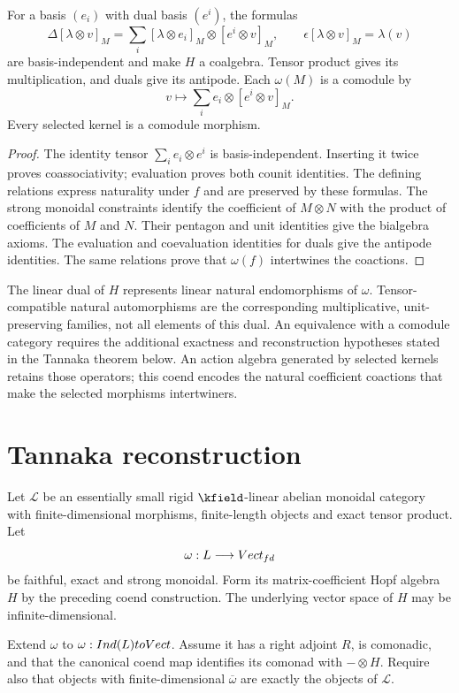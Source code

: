 \begin{proposition}\label{cyiv:k3-coend}
For a basis $(e_i)$ with dual basis $(e^i)$, the formulas
\[
 \Delta[\lambda\otimes v]_M
 =\sum_i[\lambda\otimes e_i]_M\otimes[e^i\otimes v]_M,
 \qquad \epsilon[\lambda\otimes v]_M=\lambda(v)
\]
are basis-independent and make $H$ a coalgebra.
Tensor product gives its multiplication, and duals give its antipode.
Each $\omega(M)$ is a comodule by
\[
 v\longmapsto\sum_i e_i\otimes[e^i\otimes v]_M.
\]
Every selected kernel is a comodule morphism.
\end{proposition}
\begin{proof}
The identity tensor $\sum_i e_i\otimes e^i$ is basis-independent.
Inserting it twice proves coassociativity; evaluation proves both
counit identities.
The defining relations express naturality under $f$ and are preserved
by these formulas.
The strong monoidal constraints identify the coefficient of $M\otimes N$
with the product of coefficients of $M$ and $N$.
Their pentagon and unit identities give the bialgebra axioms.
The evaluation and coevaluation identities for duals give the antipode
identities.
The same relations prove that $\omega(f)$ intertwines the coactions.
\end{proof}

The linear dual of $H$ represents linear natural endomorphisms of
$\omega$.
Tensor-compatible natural automorphisms are the corresponding
multiplicative, unit-preserving families, not all elements of this dual.
An equivalence with a comodule category requires the additional exactness
and reconstruction hypotheses stated in the Tannaka theorem below.
An action algebra generated by selected kernels retains those
operators; this coend encodes the natural coefficient coactions that
make the selected morphisms intertwiners.

\section{Tannaka reconstruction}
Let $\mathcal L$ be an essentially small rigid $\kfield$-linear
abelian monoidal category with finite-dimensional morphisms,
finite-length objects and exact tensor product. Let
\[
 \omega:L\longrightarrow Vect_{fd}
\]
be faithful, exact and strong monoidal. Form its matrix-coefficient
Hopf algebra $H$ by the preceding coend construction. The underlying
vector space of $H$ may be infinite-dimensional.

Extend $\omega$ to
$\omega:Ind(L)toVect$.
Assume it has a right adjoint $R$, is comonadic, and that the canonical
coend map identifies its comonad with $-\otimes H$. Require also that
objects with finite-dimensional $\overline\omega$ are exactly the
objects of $\mathcal L$.

